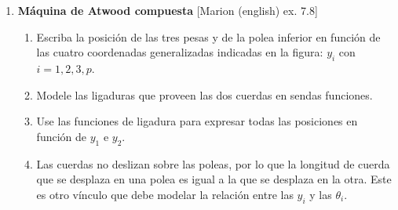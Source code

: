 \documentclass[11pt, spanish, a4paper, twoside]{article}
\begin{document}
\begin{enumerate}
	\item
	\begin{minipage}[t][6.8cm]{0.67\textwidth}
		\textbf{Máquina de Atwood compuesta} [Marion (english) ex. 7.8]\\ 
		\begin{enumerate}
			\item Escriba la posición de las tres pesas y de la polea inferior en función de 
			las cuatro coordenadas generalizadas indicadas en la figura: \(y_i\) con \(i = 1,2,3,p\). 
			\item Modele las ligaduras que proveen las dos cuerdas en sendas funciones.
			\item Use las funciones de ligadura para expresar todas las posiciones en función de \(y_1\) e \(y_2\).
			\item Las cuerdas no deslizan sobre las poleas, por lo que la longitud de cuerda que se desplaza en una polea es igual a la que se desplaza en la otra.
			Este es otro vínculo que debe modelar la relación entre las \(y_i\) y las \(\theta_i\).  
		\end{enumerate}
	\end{minipage}
	\begin{minipage}[c][0cm][t]{0.3\textwidth}
		
	\end{minipage}


\end{enumerate}
\end{document}
